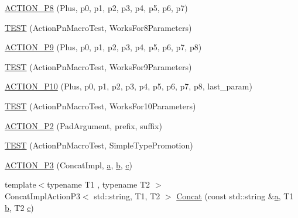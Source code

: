 \begin{DoxyCompactItemize}
\hyperlink{namespacetesting_1_1gmock__generated__actions__test_ad8766a6dbaeffbf36658d3b5f75d3b00}{A\+C\+T\+I\+O\+N\+\_\+\+P8} (Plus, p0, p1, p2, p3, p4, p5, p6, p7)
\item 
\hyperlink{namespacetesting_1_1gmock__generated__actions__test_a1913bedf1d5cf736e91f2be119de0d5f}{T\+E\+ST} (Action\+Pn\+Macro\+Test, Works\+For8\+Parameters)
\item 
\hyperlink{namespacetesting_1_1gmock__generated__actions__test_ab023ad5e95ca2c2b8845963ce7222e00}{A\+C\+T\+I\+O\+N\+\_\+\+P9} (Plus, p0, p1, p2, p3, p4, p5, p6, p7, p8)
\item 
\hyperlink{namespacetesting_1_1gmock__generated__actions__test_a52d6dc447a4a71524adfeb7c8f7b6a68}{T\+E\+ST} (Action\+Pn\+Macro\+Test, Works\+For9\+Parameters)
\item 
\hyperlink{namespacetesting_1_1gmock__generated__actions__test_a3c6e7ef6aefc94efc9e815e92f0b3e47}{A\+C\+T\+I\+O\+N\+\_\+\+P10} (Plus, p0, p1, p2, p3, p4, p5, p6, p7, p8, last\+\_\+param)
\item 
\hyperlink{namespacetesting_1_1gmock__generated__actions__test_a564fd77344f58b26577452a380c93935}{T\+E\+ST} (Action\+Pn\+Macro\+Test, Works\+For10\+Parameters)
\item 
\hyperlink{namespacetesting_1_1gmock__generated__actions__test_ad58030fe83ad47cdb4ff027f8399adb4}{A\+C\+T\+I\+O\+N\+\_\+\+P2} (Pad\+Argument, prefix, suffix)
\item 
\hyperlink{namespacetesting_1_1gmock__generated__actions__test_ad42236ad6c6d01fad6dd947ca6163d59}{T\+E\+ST} (Action\+Pn\+Macro\+Test, Simple\+Type\+Promotion)
\item 
\hyperlink{namespacetesting_1_1gmock__generated__actions__test_ae46434959151b83249e52d4869e28cf0}{A\+C\+T\+I\+O\+N\+\_\+\+P3} (Concat\+Impl, \hyperlink{_07copy_08_2_read_camera_model_8m_a551a3d351eadcc0b9b1a2f24f0fb5ea0}{a}, \hyperlink{jquery_8js_a2fa551895933fae935a0a6b87282241d}{b}, \hyperlink{jquery_8js_abce695e0af988ece0826d9ad59b8160d}{c})
\item 
{\footnotesize template$<$typename T1 , typename T2 $>$ }\\Concat\+Impl\+Action\+P3$<$ std\+::string, T1, T2 $>$ \hyperlink{namespacetesting_1_1gmock__generated__actions__test_a28213583d5450876b564a3df58d1cf91}{Concat} (const std\+::string \&\hyperlink{_07copy_08_2_read_camera_model_8m_a551a3d351eadcc0b9b1a2f24f0fb5ea0}{a}, T1 \hyperlink{jquery_8js_a2fa551895933fae935a0a6b87282241d}{b}, T2 \hyperlink{jquery_8js_abce695e0af988ece0826d9ad59b8160d}{c})
\item 

\end{DoxyCompactItemize}
